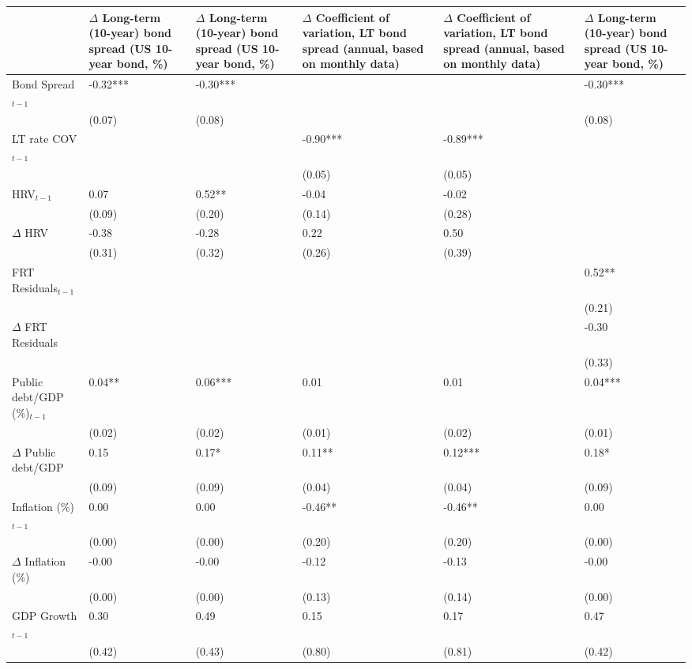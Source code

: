 {\tiny
\begin{tabular}{lp{3cm}p{3cm}p{3cm}p{3cm}p{3cm}}
  \hline
 & $\Delta$ Long-term (10-year) bond spread (US 10-year bond, \%) & $\Delta$ Long-term (10-year) bond spread (US 10-year bond, \%) & $\Delta$ Coefficient of variation, LT bond spread (annual, based on monthly data) & $\Delta$ Coefficient of variation, LT bond spread (annual, based on monthly data) & $\Delta$ Long-term (10-year) bond spread (US 10-year bond, \%) \\ 
  \hline
Bond Spread$_{t-1}$ & -0.32*** & -0.30*** &  &  & -0.30*** \\ 
   & (0.07) & (0.08) &  &  & (0.08) \\ 
  LT rate COV$_{t-1}$ &  &  & -0.90*** & -0.89*** &  \\ 
   &  &  & (0.05) & (0.05) &  \\ 
  HRV$_{t-1}$ & 0.07 & 0.52** & -0.04 & -0.02 &  \\ 
   & (0.09) & (0.20) & (0.14) & (0.28) &  \\ 
  $\Delta$ HRV & -0.38 & -0.28 & 0.22 & 0.50 &  \\ 
   & (0.31) & (0.32) & (0.26) & (0.39) &  \\ 
  FRT Residuals$_{t-1}$ &  &  &  &  & 0.52** \\ 
   &  &  &  &  & (0.21) \\ 
  $\Delta$ FRT Residuals &  &  &  &  & -0.30 \\ 
   &  &  &  &  & (0.33) \\ 
  Public debt/GDP (\%)$_{t-1}$ & 0.04** & 0.06*** & 0.01 & 0.01 & 0.04*** \\ 
   & (0.02) & (0.02) & (0.01) & (0.02) & (0.01) \\ 
  $\Delta$ Public debt/GDP & 0.15 & 0.17* & 0.11** & 0.12*** & 0.18* \\ 
   & (0.09) & (0.09) & (0.04) & (0.04) & (0.09) \\ 
  Inflation (\%) $_{t-1}$ & 0.00 & 0.00 & -0.46** & -0.46** & 0.00 \\ 
   & (0.00) & (0.00) & (0.20) & (0.20) & (0.00) \\ 
  $\Delta$ Inflation (\%) & -0.00 & -0.00 & -0.12 & -0.13 & -0.00 \\ 
   & (0.00) & (0.00) & (0.13) & (0.14) & (0.00) \\ 
  GDP Growth$_{t-1}$ & 0.30 & 0.49 & 0.15 & 0.17 & 0.47 \\ 
   & (0.42) & (0.43) & (0.80) & (0.81) & (0.42) \\ 

\end{tabular}}
